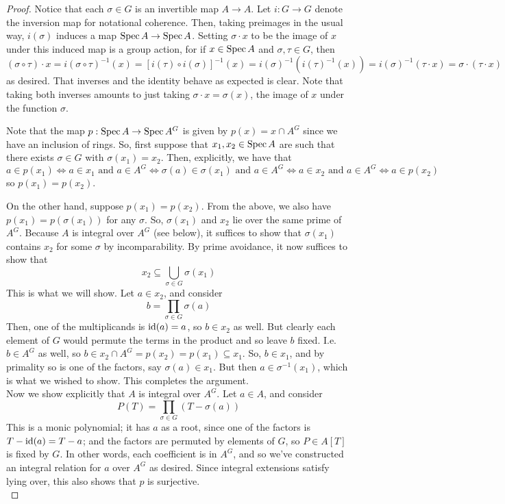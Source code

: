 \begin{proof}
	Notice that each $\sigma \in G$ is an invertible map $A \to A$. Let $i : G \to G$ denote the inversion map for notational coherence. Then, taking preimages in the usual way, $i(\sigma)$ induces a map $\operatorname{Spec} A \to \operatorname{Spec} A$. Setting $\sigma \cdot x$ to be the image of $x$ under this induced map is a group action, for if $x \in \operatorname{Spec} A$ and $\sigma,\tau \in G$, then
	\[ (\sigma \circ \tau) \cdot x = i(\sigma \circ \tau)^{-1}(x) = [i(\tau) \circ i(\sigma)]^{-1}(x) = i(\sigma)^{-1}(i(\tau)^{-1}(x)) = i(\sigma)^{-1}(\tau \cdot x) = \sigma \cdot (\tau \cdot x) \]
	as desired. That inverses and the identity behave as expected is clear. Note that taking both inverses amounts to just taking $\sigma \cdot x = \sigma(x)$, the image of $x$ under the function $\sigma$.
	
	Note that the map $p : \operatorname{Spec} A \to \operatorname{Spec} A^G$ is given by $p(x) = x \cap A^G$ since we have an inclusion of rings. So, first suppose that $x_1,x_2 \in \operatorname{Spec} A$ are such that there exists $\sigma \in G$ with $\sigma(x_1) = x_2$. Then, explicitly, we have that
	\[ a \in p(x_1) \iff a \in x_1 \text{ and } a \in A^G \iff \sigma(a) \in \sigma(x_1) \text{ and } a \in A^G \iff a \in x_2 \text{ and } a \in A^G \iff a \in p(x_2) \]
	so $p(x_1) = p(x_2)$.
	
	On the other hand, suppose $p(x_1) = p(x_2)$. From the above, we also have $p(x_1) = p(\sigma(x_1))$ for any $\sigma$. So, $\sigma(x_1)$ and $x_2$ lie over the same prime of $A^G$. Because $A$ is integral over $A^G$ (see below), it suffices to show that $\sigma(x_1)$ contains $x_2$ for some $\sigma$ by incomparability. By prime avoidance, it now suffices to show that
	\[ x_2 \subseteq \bigcup_{\sigma \in G} \sigma(x_1) \]
	This is what we will show. Let $a \in x_2$, and consider
	\[ b = \prod_{\sigma \in G} \sigma(a) \]
	Then, one of the multiplicands is $\operatorname{id}(a) = a$, so $b \in x_2$ as well. But clearly each element of $G$ would permute the terms in the product and so leave $b$ fixed. I.e. $b \in A^G$ as well, so $b \in x_2 \cap A^G = p(x_2) = p(x_1) \subseteq x_1$. So, $b \in x_1$, and by primality so is one of the factors, say $\sigma(a) \in x_1$. But then $a \in \sigma^{-1}(x_1)$, which is what we wished to show. This completes the argument. \\
	
	Now we show explicitly that $A$ is integral over $A^G$. Let $a \in A$, and consider
	\[ P(T) = \prod_{\sigma \in G} (T-\sigma(a)) \]
	This is a monic polynomial; it has $a$ as a root, since one of the factors is $T-\operatorname{id}(a) = T-a$; and the factors are permuted by elements of $G$, so $P \in A[T]$ is fixed by $G$. In other words, each coefficient is in $A^G$, and so we've constructed an integral relation for $a$ over $A^G$ as desired. Since integral extensions satisfy lying over, this also shows that $p$ is surjective. \\
	

\end{proof}

